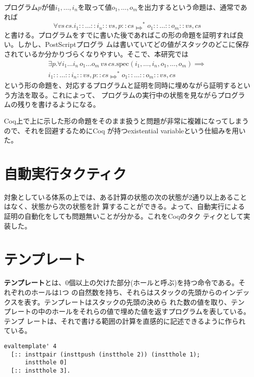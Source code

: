 \documentclass[a4paper, 10.5pt, twocolumn]{ujarticle}
\begin{document}
プログラム$p$が値$i_1, \dots, i_n$を取って値$o_1, \dots, o_m$を出力するという命題は、通常であれば
\[
 \forall \mathit{vs} \, \mathit{cs}.
 i_1 :: \ldots :: i_n :: vs, p :: cs \Mapsto^* o_1 :: \ldots :: o_m :: vs, cs
\]
と書ける。プログラムをすでに書いた後であればこの形の命題を証明すれば良い。しかし、PostScriptプログラ
ムは書いていてどの値がスタックのどこに保存されているか分かりづらくなりやすい。そこで、本研究では
\begin{align*}
 \exists p. \forall i_1 \dots i_n \, o_1 \dots o_m \, \mathit{vs} \, \mathit{cs}.
 \mathrm{spec}(i_1, \dots, i_n, o_1, \dots, o_m) \implies \\
 i_1 :: \ldots :: i_n :: vs, p :: cs \Mapsto^* o_1 :: \ldots :: o_m :: vs, cs
\end{align*}
という形の命題を、対応するプログラムと証明を同時に埋めながら証明するという方法を取る。これによって、
プログラムの実行中の状態を見ながらプログラムの残りを書けるようになる。

Coq上で上に示した形の命題をそのまま扱うと問題が非常に複雑になってしまうので、それを回避するためにCoq
が持つexistential variableという仕組みを用いた。

\section*{自動実行タクティク}

対象としている体系の上では、ある計算の状態の次の状態が2通り以上あることはなく、状態から次の状態を計
算することができる。よって、自動実行による証明の自動化をしても問題無いことが分かる。これをCoqのタク
ティクとして実装した。

\section*{テンプレート}

\textbf{テンプレート}とは、0個以上の欠けた部分(ホールと呼ぶ)を持つ命令である。それぞれのホールは1つ
の自然数を持ち、それらはスタックの先頭からのインデックスを表す。テンプレートはスタックの先頭の決めら
れた数の値を取り、テンプレートの中のホールをそれらの値で埋めた値を返すプログラムを表している。テンプ
レートは、それで書ける範囲の計算を直感的に記述できるように作られている。

\begin{lstlisting}[style=plain, label=listing:template_example, caption=テンプレートの記述の例]
evaltemplate' 4
  [:: insttpair (insttpush (instthole 2)) (instthole 1);
      instthole 0]
  [:: instthole 3].
\end{lstlisting}
\end{document}
